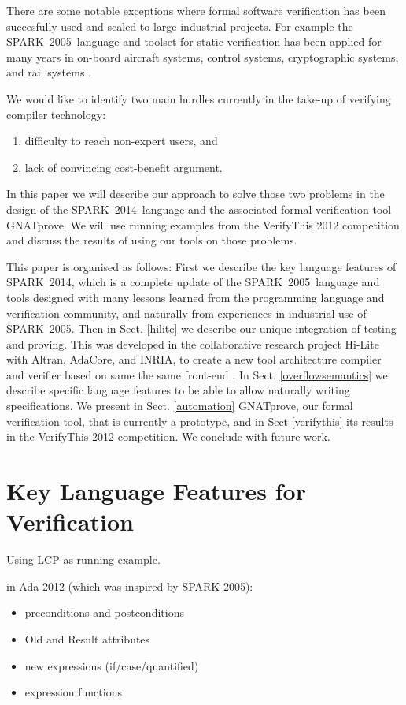 \documentclass[sttt,draft]{svjour}
\newcommand{\hilite}{Hi-Lite}
\newcommand{\gnatprove}{GNATprove\xspace}
\newcommand{\oldspark}{SPARK~2005\xspace}
\newcommand{\newspark}{SPARK~2014\xspace}
\begin{document}
There are some notable exceptions where formal software verification
has been succesfully used and scaled to large industrial projects. For
example the \oldspark\ language and toolset for static verification
has been applied for many years in on-board aircraft systems, control
systems, cryptographic systems, and rail systems
\cite{sparkbook2012,oneill2012}.

We would like to identify two main hurdles currently in the take-up of
verifying compiler technology:
%
\begin{enumerate}
\item difficulty to reach non-expert users, and
\item lack of convincing cost-benefit argument.
\end{enumerate}
%
In this paper we will describe our approach to solve those two
problems in the design of the \newspark\ language and the associated
formal verification tool \gnatprove. We will use running examples from
the VerifyThis 2012 competition and discuss the results of using our
tools on those problems.

This paper is organised as follows: First we describe the key language
features of \newspark, which is a complete update of the
\oldspark\ language and tools designed with many lessons learned from
the programming language and verification community, and naturally
from experiences in industrial use of \oldspark. Then in
Sect. \ref{hilite} we describe our unique integration of testing and
proving. This was developed in the collaborative research project
\hilite\ \cite{hiliteERTS2012} with Altran, AdaCore, and INRIA, to
create a new tool architecture compiler and verifier based on same the
same front-end \cite{ksd2012}. In Sect. \ref{overflowsemantics} we
describe specific language features to be able to allow naturally
writing specifications. We present in Sect. \ref{automation}
GNATprove, our formal verification tool, that is currently a
prototype, and in Sect \ref{verifythis} its results in the VerifyThis
2012 competition. We conclude with future work.

\section{Key Language Features for Verification}
\label{langfeatures}
Using LCP as running example.

in Ada 2012 (which was inspired by SPARK 2005):
\begin{itemize}
\item preconditions and postconditions
\item Old and Result attributes
\item new expressions (if/case/quantified)
\item expression functions
\end{itemize}
\end{document}
